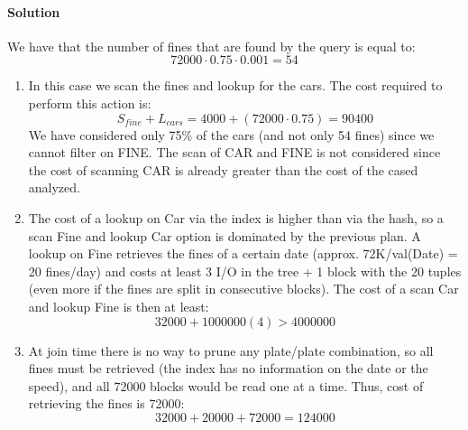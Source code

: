 \paragraph*{Solution}
We have that the number of fines that are found by the query is equal to: 
\[72000 \cdot 0.75 \cdot 0.001=54\]
\begin{enumerate}
    \item In this case we scan the fines and lookup for the cars. 
        The cost required to perform this action is: 
        \[S_{fine}+L_{cars}=4000+\left(72000 \cdot 0.75\right) =90400\]
        We have considered only 75\% of the cars (and not only 54 fines) since we cannot filter on FINE. 
        The scan of CAR and FINE is not considered since the cost of scanning CAR is already greater than the cost of the cased analyzed. 
    \item The cost of a lookup on Car via the index is higher than via the hash, so a scan Fine and lookup Car option is dominated by the previous plan.
        A lookup on Fine retrieves the fines of a certain date (approx. 72K/val(Date) = 20 fines/day) and costs at least 3 I/O in the tree + 1 block with the 20 tuples (even more if the fines are split in consecutive blocks).
        The cost of a scan Car and lookup Fine is then at least:
        \[32000 + 1000000( 4 )> 4000000\]
    \item At join time there is no way to prune any plate/plate combination, so all fines must be retrieved (the index has no information on the date or the speed), and all 72000 blocks would be read one at a time. 
        Thus, cost of retrieving the fines is 72000:
        \[32000 + 20000 + 72000 = 124000\]
\end{enumerate}